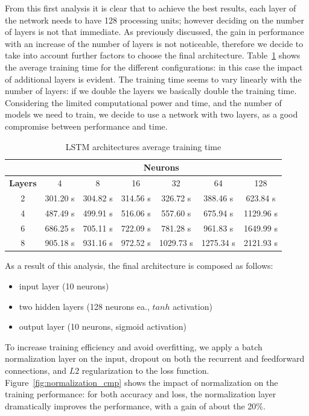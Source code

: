 From this first analysis it is clear that to achieve the best results, each layer of the network needs to have 128 processing units; however deciding on the number of layers is not that immediate. As previously discussed, the gain in performance with an increase of the number of layers is not noticeable, therefore we decide to take into account further factors to choose the final architecture. Table~\ref{tab:arch_timing} shows the average training time for the different configurations: in this case the impact of additional layers is evident. The training time seems to vary linearly with the number of layers: if we double the layers we basically double the training time. Considering the limited computational power and time, and the number of models we need to train, we decide to use a network with two layers, as a good compromise between performance and time.
\begin{table}[h]
\centering
\begin{tabular}{|c|c|c|c|c|c|c|}
\hline
 & \multicolumn{6}{c|}{\textbf{Neurons}} \\ \hline
\textbf{Layers} & 4 & 8 & 16 & 32 & 64 & 128 \\ \hline
2 & 301.20 s & 304.82 s & 314.56 s & 326.72 s & 388.46 s & 623.84 s \\ \hline
4 & 487.49 s & 499.91 s & 516.06 s & 557.60 s & 675.94 s & 1129.96 s \\ \hline
6 & 686.25 s & 705.11 s & 722.09  s & 781.28 s & 961.83 s & 1649.99 s \\ \hline
8 & 905.18 s & 931.16 s & 972.52 s & 1029.73 s & 1275.34 s & 2121.93 s \\ \hline
\end{tabular}
\caption{LSTM architectures average training time}
\label{tab:arch_timing}
\end{table}

As a result of this analysis, the final architecture is composed as follows:
\begin{itemize}
\item input layer (10 neurons)
\item two hidden layers (128 neurons ea., $tanh$ activation)
\item output layer (10 neurons, sigmoid activation)
\end{itemize}

To increase training efficiency and avoid overfitting, we apply a batch normalization layer on the input, dropout on both the recurrent and feedforward connections, and $L2$ regularization to the loss function. Figure~\ref{fig:normalization_cmp} shows the impact of normalization on the training performance: for both accuracy and loss, the normalization layer dramatically improves the performance, with a gain of about the 20\%.

